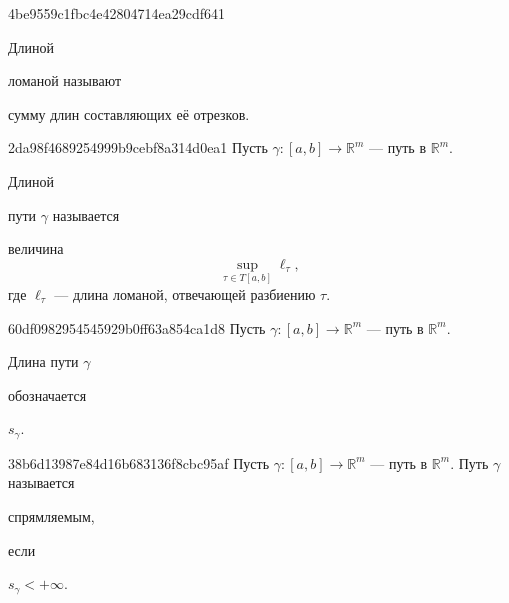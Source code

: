 \begin{note}{4be9559c1fbc4e42804714ea29cdf641}
    \begin{icloze}{2}Длиной\end{icloze} ломаной называют \begin{icloze}{1}сумму длин составляющих её отрезков.\end{icloze}
\end{note}

\begin{note}{2da98f4689254999b9cebf8a314d0ea1}
    Пусть \({ \gamma : [a, b] \to \mathbb R^{m} }\) --- путь в \({ \mathbb R^{m} }\).
    \begin{icloze}{2}Длиной\end{icloze} пути \({ \gamma }\) называется
    \begin{icloze}{1}
        величина
        \[
            \underset{\tau \in T[a, b]}{\sup} \ell_\tau,
        \]
        где \({ \ell_\tau }\) --- длина ломаной, отвечающей разбиению \({ \tau }\).
    \end{icloze}
\end{note}

\begin{note}{60df0982954545929b0ff63a854ca1d8}
    Пусть \({ \gamma : [a, b] \to \mathbb R^{m} }\) --- путь в \({ \mathbb R^{m} }\).
    \begin{icloze}{2}Длина пути \({ \gamma }\)\end{icloze} обозначается \begin{icloze}{1}\({ s_\gamma }\).\end{icloze}
\end{note}

\begin{note}{38b6d13987e84d16b683136f8cbc95af}
    Пусть \({ \gamma : [a, b] \to \mathbb R^{m} }\) --- путь в \({ \mathbb R^{m} }\).
    Путь \({ \gamma }\) называется \begin{icloze}{2}спрямляемым,\end{icloze} если \begin{icloze}{1}\({ s_\gamma < +\infty }\).\end{icloze}
\end{note}


